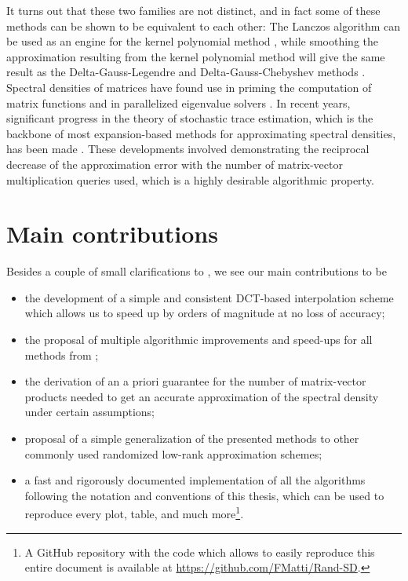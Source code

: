 It turns out that these two families are not distinct, and in fact some of these
methods can be shown to be equivalent to each other: The Lanczos algorithm
can be used as an engine for the kernel polynomial method \cite{chen2023kpm},
while smoothing the approximation resulting from the kernel polynomial method 
will give the same result as the Delta-Gauss-Legendre and Delta-Gauss-Chebyshev
methods \cite{lin2016review}.\\ 

Spectral densities of matrices have found use in priming the computation of matrix
functions \cite{fan2020spectrum} and in parallelized eigenvalue solvers
\cite{polizzi2009density, li2019slicing}. In recent years, significant progress
in the theory of stochastic trace estimation, which is the backbone of most
expansion-based methods for approximating spectral densities, has been made \cite{meyer2021hutch, persson2022hutch}.
These developments involved demonstrating the reciprocal decrease
of the approximation error with the number of matrix-vector multiplication
queries used, which is a highly desirable algorithmic property.


\section{Main contributions}
\label{sec:1-introduction-contributions}

Besides a couple of small clarifications to \cite{lin2017randomized}, we see our
main contributions to be

\begin{itemize}
    \item the development of a simple and consistent \gls{DCT}-based interpolation
          scheme which allows us to speed up \cite[algorithm~5]{lin2017randomized}
          by orders of magnitude at no loss of accuracy;
    \item the proposal of multiple algorithmic improvements and speed-ups
          for all methods from \cite{lin2017randomized};
    \item the derivation of an a priori guarantee for the number of matrix-vector
          products needed to get an accurate approximation of the spectral
          density under certain assumptions;
    \item proposal of a simple generalization of the presented methods to other
          commonly used randomized low-rank approximation schemes;
    \item a fast and rigorously documented implementation of all the algorithms
          following the notation and conventions of this thesis, which can be used to
          reproduce every plot, table, and much more\footnote{A GitHub repository
          with the code which allows to easily reproduce this entire document
          is available at \url{https://github.com/FMatti/Rand-SD}.}.
\end{itemize}

